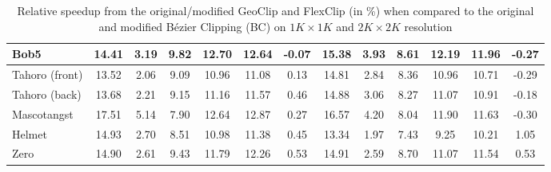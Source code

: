 \documentclass{jcgt}
\begin{document}
\begin{table}[h]
{\begin{tabular}{ | l | *{12}{c |} }
Bob5 	          & 14.41	& 3.19	& 9.82	& 12.70	& 12.64	& -0.07 & 15.38	& 3.93	& 8.61	& 12.19	& 11.96	& -0.27 \\ \hline
Tahoro (front) 	  & 13.52	& 2.06	& 9.09	& 10.96	& 11.08	& 0.13  & 14.81	& 2.84	& 8.36	& 10.96	& 10.71	& -0.29 \\ \hline
Tahoro (back) 	  & 13.68	& 2.21	& 9.15	& 11.16	& 11.57	& 0.46  & 14.88	& 3.06	& 8.27	& 11.07	& 10.91	& -0.18 \\ \hline
Mascotangst 	  & 17.51	& 5.14	& 7.90	& 12.64	& 12.87	& 0.27  & 16.57	& 4.20	& 8.04	& 11.90	& 11.63	& -0.30 \\ \hline
Helmet 	          & 14.93	& 2.70	& 8.51	& 10.98	& 11.38	& 0.45  & 13.34	& 1.97	& 7.43	& 9.25	& 10.21	& 1.05  \\ \hline
Zero 	          & 14.90	& 2.61	& 9.43	& 11.79	& 12.26	& 0.53  & 14.91	& 2.59	& 8.70	& 11.07	& 11.54	& 0.53  \\
	\hline
	\end{tabular}}
	\caption{Relative speedup from the original/modified GeoClip and FlexClip (in \%) when compared to the original and modified Bézier Clipping (BC) on $1K\times1K$ and $2K\times2K$ resolution}
   \label{tbl:geo_test_percent}
\end{table}
\end{document}
